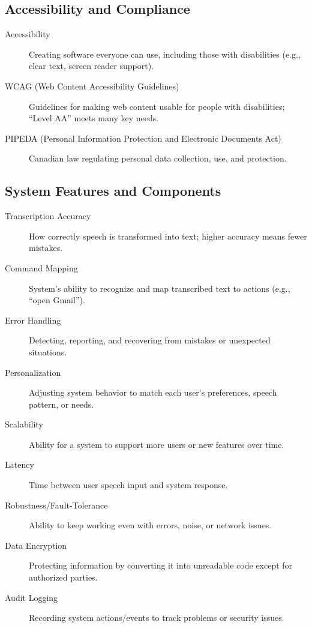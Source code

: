 \documentclass[11pt]{article}
\begin{document}
\subsection*{Accessibility and Compliance}

\begin{description}
  \item[Accessibility] Creating software everyone can use, including those with disabilities (e.g., clear text, screen reader support).
  \item[WCAG (Web Content Accessibility Guidelines)] Guidelines for making web content usable for people with disabilities; “Level AA” meets many key needs.
  \item[PIPEDA (Personal Information Protection and Electronic Documents Act)] Canadian law regulating personal data collection, use, and protection.
\end{description}

\subsection*{System Features and Components}

\begin{description}
  \item[Transcription Accuracy] How correctly speech is transformed into text; higher accuracy means fewer mistakes.
  \item[Command Mapping] System’s ability to recognize and map transcribed text to actions (e.g., “open Gmail”).
  \item[Error Handling] Detecting, reporting, and recovering from mistakes or unexpected situations.
  \item[Personalization] Adjusting system behavior to match each user’s preferences, speech pattern, or needs.
  \item[Scalability] Ability for a system to support more users or new features over time.
  \item[Latency] Time between user speech input and system response.
  \item[Robustness/Fault-Tolerance] Ability to keep working even with errors, noise, or network issues.
  \item[Data Encryption] Protecting information by converting it into unreadable code except for authorized parties.
  \item[Audit Logging] Recording system actions/events to track problems or security issues.
\end{description}
\end{document}
